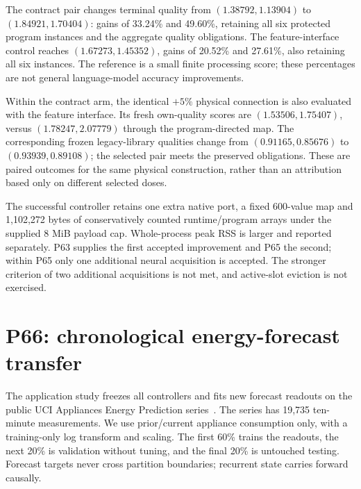 \documentclass[11pt]{article}
\begin{document}
\begin{table}[ht]\centering\small
\caption{P65 common terminal streams. The reference is the already improved Checkpoint V runtime, evaluated on these same inputs. Six protected program instances belong to three frozen libraries, not six distinct target functions.}\label{tab:second}
\end{table}

The contract pair changes terminal quality from $(1.38792,1.13904)$ to $(1.84921,1.70404)$: gains of 33.24\% and 49.60\%, retaining all six protected program instances and the aggregate quality obligations. The feature-interface control reaches $(1.67273,1.45352)$, gains of 20.52\% and 27.61\%, also retaining all six instances. The reference is a small finite processing score; these percentages are not general language-model accuracy improvements.

Within the contract arm, the identical $+5\%$ physical connection is also evaluated with the feature interface. Its fresh own-quality scores are $(1.53506,1.75407)$, versus $(1.78247,2.07779)$ through the program-directed map. The corresponding frozen legacy-library qualities change from $(0.91165,0.85676)$ to $(0.93939,0.89108)$; the selected pair meets the preserved obligations. These are paired outcomes for the same physical construction, rather than an attribution based only on different selected doses.

The successful controller retains one extra native port, a fixed 600-value map and 1,102,272 bytes of conservatively counted runtime/program arrays under the supplied 8 MiB payload cap. Whole-process peak RSS is larger and reported separately. P63 supplies the first accepted improvement and P65 the second; within P65 only one additional neural acquisition is accepted. The stronger criterion of two additional acquisitions is not met, and active-slot eviction is not exercised.

\section{P66: chronological energy-forecast transfer}
The application study freezes all controllers and fits new forecast readouts on the public UCI Appliances Energy Prediction series~\cite{uci}. The series has 19,735 ten-minute measurements. We use prior/current appliance consumption only, with a training-only log transform and scaling. The first 60\% trains the readouts, the next 20\% is validation without tuning, and the final 20\% is untouched testing. Forecast targets never cross partition boundaries; recurrent state carries forward causally.
\end{document}
